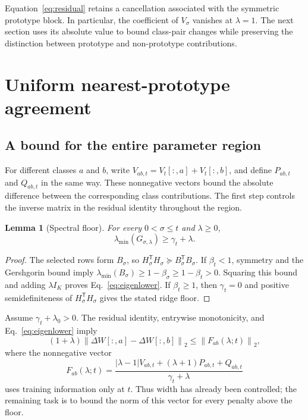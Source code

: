 \documentclass[preprint,12pt,authoryear]{elsarticle}
\newtheorem{lemma}{Lemma}
\newcommand{\norm}[1]{\left\lVert#1\right\rVert}
\newcommand{\tr}{\mathsf{T}}
\begin{document}
Equation~\eqref{eq:residual} retains a cancellation associated with the symmetric prototype block. In particular, the coefficient of $V_\sigma$ vanishes at $\lambda=1$. The next section uses its absolute value to bound class-pair changes while preserving the distinction between prototype and non-prototype contributions.

\section{Uniform nearest-prototype agreement}
\subsection{A bound for the entire parameter region}
For different classes $a$ and $b$, write $V_{ab,t}=V_t[:,a]+V_t[:,b]$, and define $P_{ab,t}$ and $Q_{ab,t}$ in the same way. These nonnegative vectors bound the absolute difference between the corresponding class contributions. The first step controls the inverse matrix in the residual identity throughout the region.

\begin{lemma}[Spectral floor]
For every $0<\sigma\leq t$ and $\lambda\geq0$,
\begin{equation}
 \lambda_{\min}(G_{\sigma,\lambda})\geq\gamma_t+\lambda.
 \label{eq:eigenlower}
\end{equation}
\end{lemma}
\begin{proof}
The selected rows form $B_\sigma$, so $H_\sigma^\tr H_\sigma\succeq B_\sigma^\tr B_\sigma$. If $\beta_t<1$, symmetry and the Gershgorin bound imply $\lambda_{\min}(B_\sigma)\geq1-\beta_\sigma\geq1-\beta_t>0$. Squaring this bound and adding $\lambda I_K$ proves Eq.~\eqref{eq:eigenlower}. If $\beta_t\geq1$, then $\gamma_t=0$ and positive semidefiniteness of $H_\sigma^\tr H_\sigma$ gives the stated ridge floor.
\end{proof}

Assume $\gamma_t+\lambda_0>0$. The residual identity, entrywise monotonicity, and Eq.~\eqref{eq:eigenlower} imply
\begin{equation}
 (1+\lambda)\norm{\Delta W[:,a]-\Delta W[:,b]}_2
 \leq\norm{F_{ab}(\lambda;t)}_2,
 \label{eq:pairperturb}
\end{equation}
where the nonnegative vector
\begin{equation}
 F_{ab}(\lambda;t)=
 \frac{|\lambda-1|V_{ab,t}+(\lambda+1)P_{ab,t}+Q_{ab,t}}
 {\gamma_t+\lambda}
 \label{eq:majorant}
\end{equation}
uses training information only at $t$. Thus width has already been controlled; the remaining task is to bound the norm of this vector for every penalty above the floor.
\end{document}
